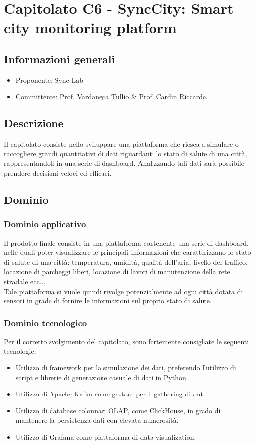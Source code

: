 \documentclass[12pt]{report}
\begin{document}
\chapter{Capitolato C6 - SyncCity: Smart city monitoring platform}\label{chapter:6}
\section{Informazioni generali}
\begin{itemize}
    \item Proponente: Sync Lab
    \item Committente: Prof. Vardanega Tullio \& Prof. Cardin Riccardo.
\end{itemize}

\section{Descrizione}
Il capitolato consiste nello sviluppare una piattaforma che riesca a simulare o raccogliere grandi quantitativi di dati riguardanti lo stato di salute di una città, rappresentandoli in una serie di dashboard. Analizzando tali dati sarà possibile prendere decisioni veloci ed efficaci.


\section{Dominio}
\subsection{Dominio applicativo}
Il prodotto finale consiste in una piattaforma contenente una serie di dashboard, nelle quali poter visualizzare le principali informazioni che caratterizzano lo stato di salute di una città: temperatura, umidità, qualità dell'aria, livello del traffico, locazione di parcheggi liberi, locazione di lavori di manutenzione della rete stradale ecc...\\
Tale piattaforma si vuole quindi rivolge potenzialmente ad ogni città dotata di sensori in grado di fornire le informazioni sul proprio stato di salute.

\subsection{Dominio tecnologico}
Per il corretto svolgimento del capitolato, sono fortemente consigliate le seguenti tecnologie:
\begin{itemize}
  \item Utilizzo di framework per la simulazione dei dati, preferendo l'utilizzo di script e librerie di generazione casuale di dati in Python.
  \item Utilizzo di Apache Kafka come gestore per il gathering di dati.
  \item Utilizzo di database colonnari OLAP, come ClickHouse, in grado di mantenere la persistenza dati con elevata numerosità.
  \item Utilizzo di Grafana come piattaforma di data visualization.
\end{itemize}
\end{document}
